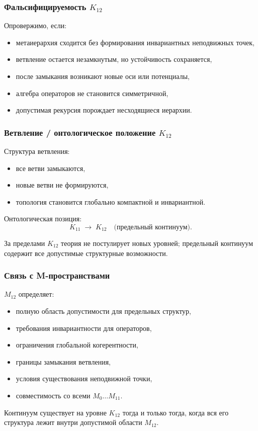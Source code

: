 \subsubsection{Фальсифицируемость $K_{12}$}

Опровержимо, если:
\begin{itemize}
    \item метаиерархия сходится без формирования инвариантных неподвижных точек,
    \item ветвление остается незамкнутым, но устойчивость сохраняется,
    \item после замыкания возникают новые оси или потенциалы,
    \item алгебра операторов не становится симметричной,
    \item допустимая рекурсия порождает несходящиеся иерархии.
\end{itemize}

\subsubsection{Ветвление / онтологическое положение $K_{12}$}

Структура ветвления:
\begin{itemize}
    \item все ветви замыкаются,
    \item новые ветви не формируются,
    \item топология становится глобально компактной и инвариантной.
\end{itemize}

Онтологическая позиция:
\[
K_{11} \;\longrightarrow\; K_{12} \quad \text{(предельный континуум)}.
\]

За пределами $K_{12}$ теория не постулирует новых уровней; предельный
континуум содержит все допустимые структурные возможности.

\subsubsection{Связь с M-пространствами}

$M_{12}$ определяет:
\begin{itemize}
    \item полную область допустимости для предельных структур,
    \item требования инвариантности для операторов,
    \item ограничения глобальной когерентности,
    \item границы замыкания ветвления,
    \item условия существования неподвижной точки,
    \item совместимость со всеми $M_0\dots M_{11}$.
\end{itemize}

Континуум существует на уровне $K_{12}$ тогда и только тогда, когда вся его
структура лежит внутри допустимой области $M_{12}$.
